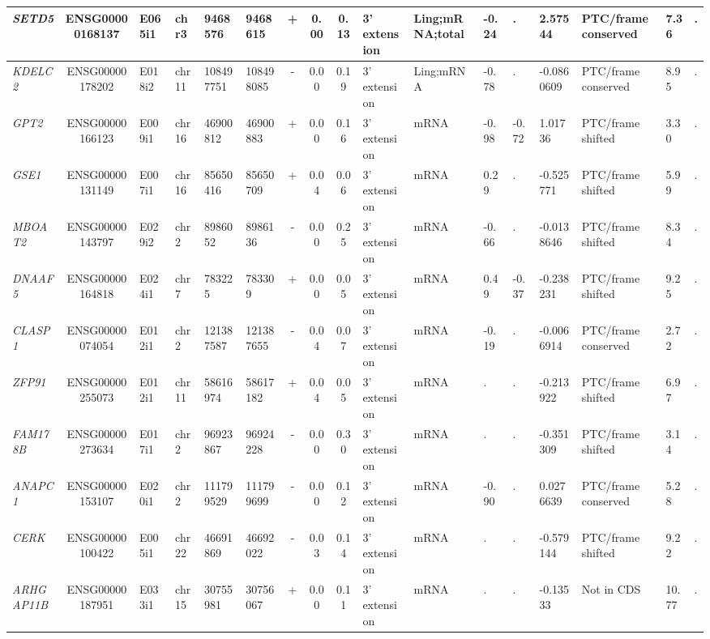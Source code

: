 \begin{landscape}
\begin{table}
{\begin{tabular}{|l|c|l|l|l|l|c|c|c|l|l|l|l|l|l|l|l|}
		\textit{SETD5} & ENSG00000168137 & E065i1 & chr3  & 9468576 & 9468615 & +     & 0.00  & 0.13  & 3' extension & Ling;mRNA;total & -0.24 & . & 2.57544 & PTC/frame conserved & 7.36  & . \\ \hline
		\textit{KDELC2} & ENSG00000178202 & E018i2 & chr11 & 108497751 & 108498085 & -     & 0.00  & 0.19  & 3' extension & Ling;mRNA & -0.78 & . & -0.0860609 & PTC/frame conserved & 8.95  & . \\ \hline
		\textit{GPT2} & ENSG00000166123 & E009i1 & chr16 & 46900812 & 46900883 & +     & 0.00  & 0.16  & 3' extension & mRNA  & -0.98 & -0.72 & 1.01736 & PTC/frame shifted & 3.30  & . \\ \hline
		\textit{GSE1} & ENSG00000131149 & E007i1 & chr16 & 85650416 & 85650709 & +     & 0.04  & 0.06  & 3' extension & mRNA  & 0.29  & . & -0.525771 & PTC/frame shifted & 5.99  & . \\ \hline
		\textit{MBOAT2} & ENSG00000143797 & E029i2 & chr2  & 8986052 & 8986136 & -     & 0.00  & 0.25  & 3' extension & mRNA  & -0.66 & . & -0.0138646 & PTC/frame shifted & 8.34  & . \\ \hline
		\textit{DNAAF5} & ENSG00000164818 & E024i1 & chr7  & 783225 & 783309 & +     & 0.00  & 0.05  & 3' extension & mRNA  & 0.49  & -0.37 & -0.238231 & PTC/frame shifted & 9.25  & . \\ \hline
		\textit{CLASP1} & ENSG00000074054 & E012i1 & chr2  & 121387587 & 121387655 & -     & 0.04  & 0.07  & 3' extension & mRNA  & -0.19 & . & -0.0066914 & PTC/frame conserved & 2.72  & . \\ \hline
		\textit{ZFP91} & ENSG00000255073 & E012i1 & chr11 & 58616974 & 58617182 & +     & 0.04  & 0.05  & 3' extension & mRNA  & . & . & -0.213922 & PTC/frame shifted & 6.97  & . \\ \hline
		\textit{FAM178B} & ENSG00000273634 & E017i1 & chr2  & 96923867 & 96924228 & -     & 0.00  & 0.30  & 3' extension & mRNA  & . & . & -0.351309 & PTC/frame shifted & 3.14  & . \\  \hline
		\textit{ANAPC1} & ENSG00000153107 & E020i1 & chr2  & 111799529 & 111799699 & -     & 0.00  & 0.12  & 3' extension & mRNA  & -0.90 & . & 0.0276639 & PTC/frame conserved & 5.28  & . \\ \hline
		\textit{CERK} & ENSG00000100422 & E005i1 & chr22 & 46691869 & 46692022 & -     & 0.03  & 0.14  & 3' extension & mRNA  & . & . & -0.579144 & PTC/frame shifted & 9.22  & . \\ \hline
		\textit{ARHGAP11B} & ENSG00000187951 & E033i1 & chr15 & 30755981 & 30756067 & +     & 0.00  & 0.11  & 3' extension & mRNA  & . & . & -0.13533 & Not in CDS     & 10.77 & . \\ \hline

\end{tabular}}
\end{table}
\end{landscape}
